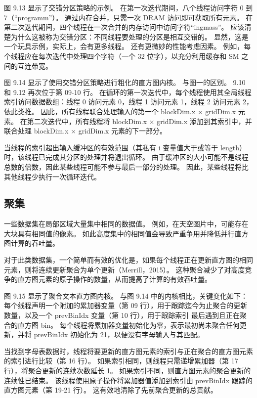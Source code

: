 图 9.13 显示了交错分区策略的示例。 在第一次迭代期间，八个线程访问字符 0 到 7（“programm”）。 通过内存合并，只需一次 DRAM 访问即可获取所有元素。 在第二次迭代期间，四个线程在一次合并的内存访问中访问字符“ingmass”。 应该清楚为什么这被称为交错分区：不同线程要处理的分区是相互交错的。 显然，这是一个玩具示例，实际上，会有更多线程。 还有更微妙的性能考虑因素。 例如，每个线程应在每次迭代中处理四个字符（一个 32 位字），以充分利用缓存和 SM 之间的互连带宽。

图 9.14 显示了使用交错分区策略进行粗化的直方图内核。 与图一的区别。 9.10 和 9.12 再次位于第 09-10 行。 在循环的第一次迭代中，每个线程使用其全局线程索引访问数据数组：线程 0 访问元素 0，线程 1 访问元素 1，线程 2 访问元素 2，依此类推。 因此，所有线程联合处理输入的第一个 blockDim.x × gridDim.x 元素。 在第二次迭代中，所有线程将 blockDim.x × gridDim.x 添加到其索引中，并联合处理 blockDim.x × gridDim.x 元素的下一部分。

当线程的索引超出输入缓冲区的有效范围（其私有 i 变量值大于或等于 length）时，该线程已完成其分区的处理并将退出循环。 由于缓冲区的大小可能不是线程总数的倍数，因此某些线程可能不参与最后一部分的处理。 因此，某些线程将比其他线程少执行一次循环迭代。

\subsection{聚集}
一些数据集在局部区域大量集中相同的数据值。 例如，在天空图片中，可能存在大块具有相同值的像素。 如此高度集中的相同值会导致严重争用并降低并行直方图计算的吞吐量。

对于此类数据集，一个简单而有效的优化是，如果每个线程正在更新直方图的相同元素，则将连续更新聚合为单个更新（Merrill，2015）。 这种聚合减少了对高度竞争的直方图元素的原子操作的数量，从而提高了计算的有效吞吐量。

图 9.15 显示了聚合文本直方图内核。 与图 9.14 中的内核相比，关键变化如下：每个线程声明一个附加的累加器变量（第 09 行），用于跟踪迄今为止聚合的更新数量，以及一个 prevBinIdx 变量（第 10 行），用于跟踪索引 最后遇到且正在聚合的直方图 bin。 每个线程将累加器变量初始化为零，表示最初尚未聚合任何更新，并将 prevBinIdx 初始化为 21，以便没有字母输入与其匹配。

当找到字母表数据时，线程将要更新的直方图元素的索引与正在聚合的直方图元素的索引进行比较（第 16 行）。 如果索引相同，则线程只需递增累加器（第 17 行），将聚合更新的连续次数延长 1。 如果索引不同，则直方图元素的聚合更新的连续性已结束。 该线程使用原子操作将累加器值添加到索引由 prevBinIdx 跟踪的直方图元素（第 19-21 行）。 这有效地清除了先前聚合更新的总贡献。

